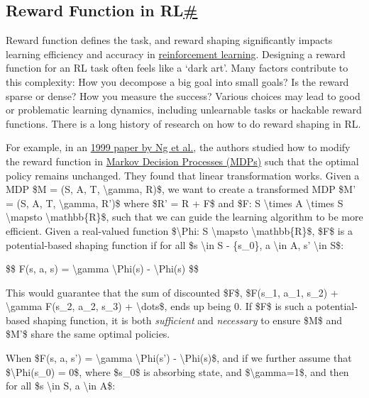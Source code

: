 \subsection{\texorpdfstring{Reward Function in RL\hyperref[reward-function-in-rl]{\#}}{Reward Function in RL\#}}\label{reward-function-in-rl}

Reward function defines the task, and reward shaping significantly impacts learning efficiency and accuracy in \href{https://lilianweng.github.io/posts/2018-02-19-rl-overview/}{reinforcement learning}. Designing a reward function for an RL task often feels like a `dark art'. Many factors contribute to this complexity: How you decompose a big goal into small goals? Is the reward sparse or dense? How you measure the success? Various choices may lead to good or problematic learning dynamics, including unlearnable tasks or hackable reward functions. There is a long history of research on how to do reward shaping in RL.

For example, in an \href{https://people.eecs.berkeley.edu/~pabbeel/cs287-fa09/readings/NgHaradaRussell-shaping-ICML1999.pdf}{1999 paper by Ng et al.}, the authors studied how to modify the reward function in \href{https://lilianweng.github.io/posts/2018-02-19-rl-overview/\#markov-decision-processes}{Markov Decision Processes (MDPs)} such that the optimal policy remains unchanged. They found that linear transformation works. Given a MDP \$M = (S, A, T, \textbackslash gamma, R)\$, we want to create a transformed MDP \$M' = (S, A, T, \textbackslash gamma, R')\$ where \$R' = R + F\$ and \$F: S \textbackslash times A \textbackslash times S \textbackslash mapsto \textbackslash mathbb\{R\}\$, such that we can guide the learning algorithm to be more efficient. Given a real-valued function \$\textbackslash Phi: S \textbackslash mapsto \textbackslash mathbb\{R\}\$, \$F\$ is a potential-based shaping function if for all \$s \textbackslash in S - \{s\_0\}, a \textbackslash in A, s' \textbackslash in S\$:

\$\$ F(s, a, s\textquotesingle) = \textbackslash gamma \textbackslash Phi(s\textquotesingle) - \textbackslash Phi(s) \$\$

This would guarantee that the sum of discounted \$F\$, \$F(s\_1, a\_1, s\_2) + \textbackslash gamma F(s\_2, a\_2, s\_3) + \textbackslash dots\$, ends up being 0. If \$F\$ is such a potential-based shaping function, it is both \emph{sufficient} and \emph{necessary} to ensure \$M\$ and \$M'\$ share the same optimal policies.

When \$F(s, a, s') = \textbackslash gamma \textbackslash Phi(s') - \textbackslash Phi(s)\$, and if we further assume that \$\textbackslash Phi(s\_0) = 0\$, where \$s\_0\$ is absorbing state, and \$\textbackslash gamma=1\$, and then for all \$s \textbackslash in S, a \textbackslash in A\$:

